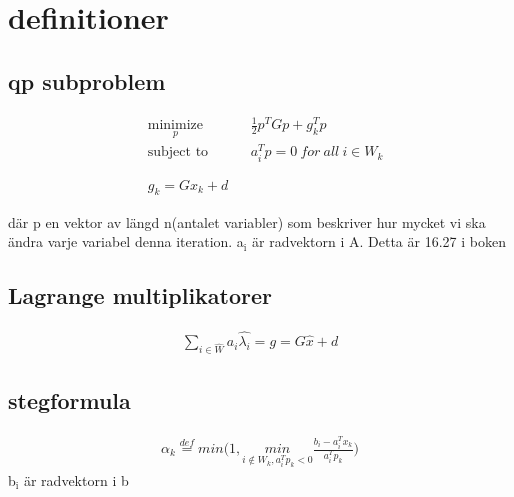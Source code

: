 \section{definitioner}
\subsection{qp subproblem}
\begin{equation*}
\begin{aligned}
& \underset{p}{\text{minimize}}
& & \frac{1}{2} p^{T}Gp+g_k^{T}p \\
& \text{subject to}
& & a_i^Tp= 0 \ for \ all \ i \in W_k \\
\\
\\
& g_k=Gx_k+d
\end{aligned}
\end{equation*}


där p en vektor av längd n(antalet variabler) som beskriver hur mycket vi ska ändra varje variabel denna iteration.  a$_{\text{i}}$ är radvektorn i A. Detta är 16.27 i boken

\subsection{Lagrange multiplikatorer}
\begin{equation*}
\begin{aligned}
\sum_{i\in \hat{W}}a_i\hat{\lambda_i}=g=G\hat{x}+d
\end{aligned}
\end{equation*}

\subsection{stegformula}
\begin{equation*}
\begin{aligned}
\alpha_k\overset{def}{=}min \bigg(1,\underset{i\notin W_k,a_i^Tp_k<0}{min} \frac{b_i-a_i^Tx_k}{a_i^Tp_k} \bigg)
\end{aligned}
\end{equation*}
b$_{\text{i}}$ är radvektorn i b